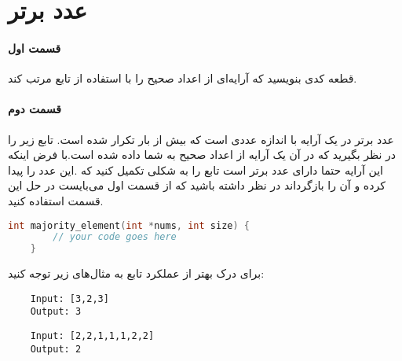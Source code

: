 \documentclass[../main.tex]{subfiles}
\begin{document}
\section{عدد برتر}
\paragraph{قسمت اول}
قطعه کدی بنویسید که آرایه‌ای از اعداد صحیح را با استفاده از تابع
مرتب کند.

\paragraph{قسمت دوم}
عدد برتر در یک آرایه با اندازه 
عددی است که بیش از 
بار تکرار شده است.
تابع زیر را در نظر بگیرید که در آن یک آرایه از اعداد صحیح به شما داده شده است.با فرض اینکه این آرایه حتما دارای عدد برتر است تابع را به شکلی تکمیل کنید که
.این عدد را پیدا کرده و آن را بازگرداند
در نظر داشته باشید که از قسمت اول می‌بایست در حل این قسمت استفاده کنید.

\begin{latin}
\begin{lstlisting}[language=c]
    int majority_element(int *nums, int size) {
        // your code goes here
    }
\end{lstlisting}
\end{latin}

برای درک بهتر از عملکرد تابع به مثال‌های زیر توجه کنید:

\begin{latin}
\begin{verbatim}
    Input: [3,2,3]
    Output: 3
\end{verbatim}

\begin{verbatim}
    Input: [2,2,1,1,1,2,2]
    Output: 2
\end{verbatim}
\end{latin}
\end{document}
